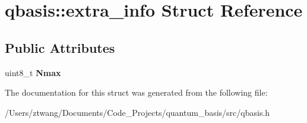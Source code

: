\hypertarget{structqbasis_1_1extra__info}{}\section{qbasis\+:\+:extra\+\_\+info Struct Reference}
\label{structqbasis_1_1extra__info}
\subsection*{Public Attributes}
\begin{DoxyCompactItemize}
\item 
\mbox{\label{structqbasis_1_1extra__info_a2e87b8e6552ad93094911bf8a042a772}} 
uint8\+\_\+t {\bfseries Nmax}
\end{DoxyCompactItemize}


The documentation for this struct was generated from the following file\+:\begin{DoxyCompactItemize}
\item 
/\+Users/ztwang/\+Documents/\+Code\+\_\+\+Projects/quantum\+\_\+basis/src/qbasis.\+h\end{DoxyCompactItemize}
